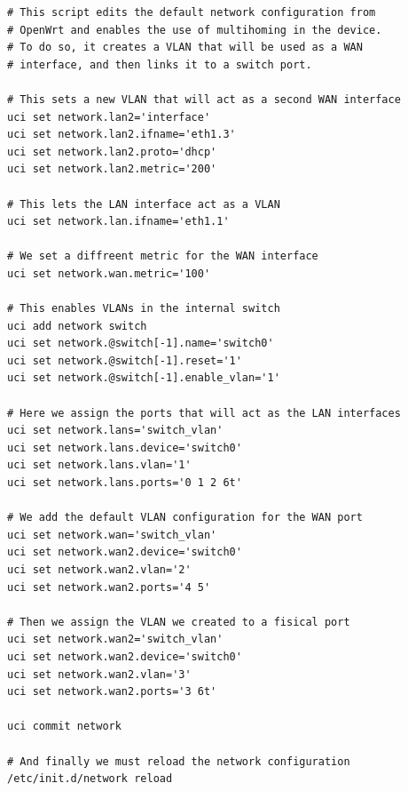 \documentclass[11pt]{article}
\begin{document}
\lstset{caption=Script de configuració de la xarxa: WRT1200AC}
\begin{lstlisting}[frame=single]
# This script edits the default network configuration from 
# OpenWrt and enables the use of multihoming in the device.
# To do so, it creates a VLAN that will be used as a WAN 
# interface, and then links it to a switch port.

# This sets a new VLAN that will act as a second WAN interface
uci set network.lan2='interface'
uci set network.lan2.ifname='eth1.3'
uci set network.lan2.proto='dhcp'
uci set network.lan2.metric='200'

# This lets the LAN interface act as a VLAN
uci set network.lan.ifname='eth1.1'

# We set a diffreent metric for the WAN interface
uci set network.wan.metric='100'

# This enables VLANs in the internal switch
uci add network switch
uci set network.@switch[-1].name='switch0'
uci set network.@switch[-1].reset='1'
uci set network.@switch[-1].enable_vlan='1'

# Here we assign the ports that will act as the LAN interfaces
uci set network.lans='switch_vlan'
uci set network.lans.device='switch0'
uci set network.lans.vlan='1'
uci set network.lans.ports='0 1 2 6t'

# We add the default VLAN configuration for the WAN port
uci set network.wan='switch_vlan'
uci set network.wan2.device='switch0'
uci set network.wan2.vlan='2'
uci set network.wan2.ports='4 5'

# Then we assign the VLAN we created to a fisical port
uci set network.wan2='switch_vlan'
uci set network.wan2.device='switch0'
uci set network.wan2.vlan='3'
uci set network.wan2.ports='3 6t'

uci commit network

# And finally we must reload the network configuration
/etc/init.d/network reload
\end{lstlisting}
\end{document}
